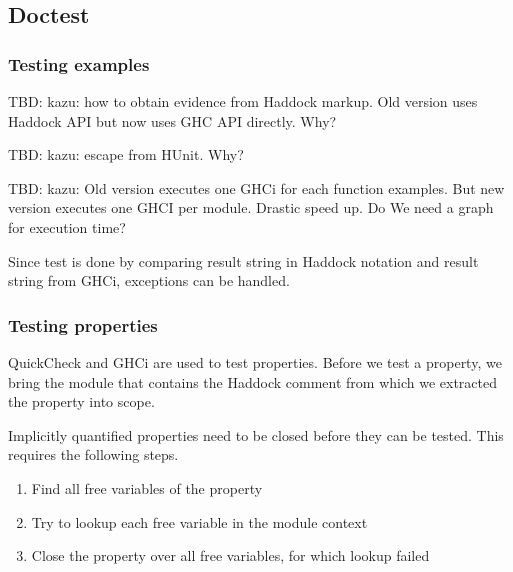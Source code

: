 \documentclass[preprint]{sigplanconf}
\begin{document}



\subsection{Doctest}
\label{sec:doctest}

\subsubsection{Testing examples}

TBD: kazu: how to obtain evidence from Haddock markup.
Old version uses Haddock API but now uses GHC API directly. Why?

TBD: kazu: escape from HUnit. Why?

TBD: kazu: Old version executes one GHCi for each function examples.
But new version executes one GHCI per module.
Drastic speed up. Do We need a graph for execution time?

Since test is done by comparing result string in Haddock notation
and result string from GHCi, exceptions can be handled.

\subsubsection{Testing properties}

\noindent QuickCheck and GHCi are used to test properties.  Before we
test a property, we bring the module that contains the Haddock comment
from which we extracted the property into scope.

Implicitly quantified properties need to be closed before they can be
tested.  This requires the following steps.
\begin{enumerate}
    \item
        Find all free variables of the property
    \item
        Try to lookup each free variable in the module context
    \item
        Close the property over all free variables, for which lookup
        failed
\end{enumerate}
\end{document}
